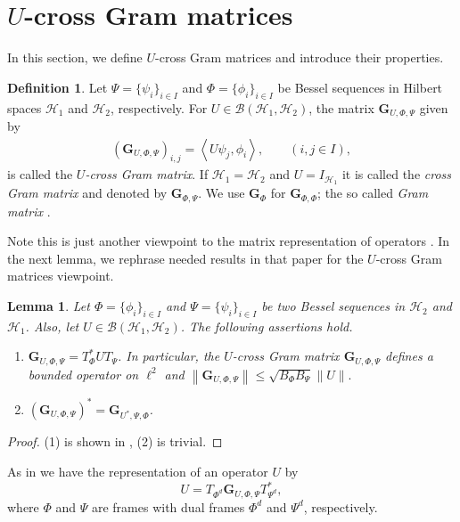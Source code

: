 \documentclass{birkjour}
\newtheorem{lem}[thm]{Lemma}
\theoremstyle{definition}
\newtheorem{defn}[thm]{Definition}
\theoremstyle{remark}
\numberwithin{equation}{section}
\newcommand{\BL}[1]{
{\mathcal B} \left( #1 \right)
}
\begin{document}
\section{$U$-cross Gram matrices \label{sec:basicdef}}
In this section, we define $U$-cross Gram matrices and introduce their properties.
\begin{defn}
Let $\Psi=\{\psi_{i}\}_{i\in I}$  and $\Phi=\{\phi_{i}\}_{i\in I}$
be  Bessel sequences in  Hilbert spaces $\mathcal{H}_{1}$ and
$\mathcal{ H}_{2}$, respectively. For $U\in
\BL{\mathcal{H}_{1},\mathcal{H}_{2}}$, the matrix
$\mathbf{G}_{U,\Phi,\Psi}$ given by
\begin{eqnarray}\label{gram}
\left(\mathbf{G}_{U,\Phi,\Psi}\right)_{i,j}=\left\langle U\psi_{j},\phi_{i}\right\rangle,\qquad\left(i,j\in I\right),
\end{eqnarray}
 is  called the \textit{$U$-cross Gram matrix}. If $\mathcal{H}_{1}=\mathcal{H}_{2}$ and $U=I_{\mathcal{H}_{1}}$ it is called the \textit{cross Gram matrix} and denoted by $\mathbf{G}_{\Phi,\Psi}$. We use $\mathbf{G}_{\Phi}$ for $\mathbf{G}_{\Phi,\Phi}$; the so called \textit{Gram matrix} \cite{Chr08}.
\end{defn}
 Note this is just another viewpoint to the matrix
representation of operators \cite{xxlframoper1}. 
In the next
lemma, we rephrase needed results in that paper for the $U$-cross
Gram matrices viewpoint.
\begin{lem}
Let $\Phi=\{\phi_{i}\}_{i\in I}$ and $\Psi=\{\psi_{i}\}_{i\in I}$
be two Bessel sequences in $\mathcal{H}_{2}$ and
 $\mathcal{H}_{1}$. Also, let $U\in
\BL{\mathcal{H}_{1},\mathcal{H}_{2}}$. The following assertions
hold.
 \begin{enumerate}
\item[(1)]  $\mathbf{G}_{U,\Phi,\Psi}=T_{\Phi}^{*}UT_{\Psi}$. In particular, the $U$-cross Gram matrix $\mathbf{G}_{U,\Phi,\Psi}$ defines a bounded operator on  $\ell^{2}$  and
$
\left\|\mathbf{G}_{U,\Phi,\Psi}\right\|\leq \sqrt{B_{\Phi}B_{\Psi}}\|U\|.
$
\item[(2)] $\left(\mathbf{G}_{U,\Phi,\Psi}\right)^{*}=\mathbf{G}_{U^{*},\Psi,\Phi}$.
\end{enumerate}
\end{lem}
\begin{proof} (1) is shown in \cite{xxlframoper1}, (2) is trivial.
\end{proof}
As in \cite{xxlframoper1} we have the representation of an
operator $U$ by
\begin{equation} \label{eq:oprec}
U=T_{ \Phi^{d}} \mathbf{G}_{U,\Phi,\Psi}T_{ \Psi^d}^*, 
\end{equation}
where $\Phi$ and $\Psi$ are frames with dual frames $\Phi^d$ and $\Psi^d$, respectively.
\end{document}
